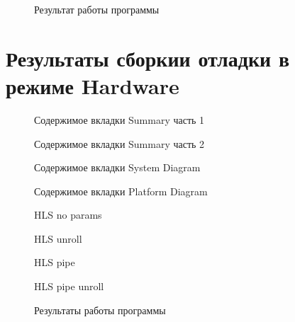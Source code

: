 \begin{figure}[ph!]
	\caption{Результат работы программы}
\end{figure}

\newpage

\chapter{Результаты сборкии отладки в режиме Hardware}

\begin{figure}[ph!]
	\caption{Содержимое вкладки Summary часть 1}
\end{figure}

\begin{figure}[ph!]
	\caption{Содержимое вкладки Summary часть 2}
\end{figure}

\begin{figure}[ph!]
	\caption{Содержимое вкладки System Diagram}
\end{figure}

\begin{figure}[ph!]
	\caption{Содержимое вкладки Platform Diagram}
\end{figure}

\begin{figure}[ph!]
	\caption{HLS no params}
\end{figure}

\begin{figure}[ph!]
	\caption{HLS unroll}
\end{figure}

\begin{figure}[ph!]
	\caption{HLS pipe}
\end{figure}

\begin{figure}[ph!]
	\caption{HLS pipe unroll}
\end{figure}

\begin{figure}[ph!]
	\caption{Результаты работы программы}
\end{figure}

